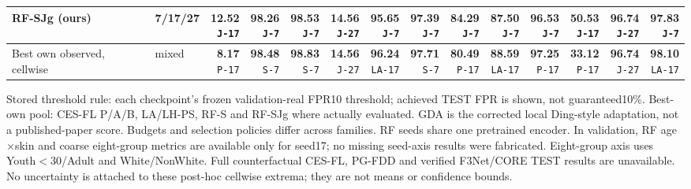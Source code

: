 \documentclass[10pt]{article}
\newcommand{\note}[1]{{\fontsize{8}{10}\selectfont #1\par}}
\begin{document}
{\begin{tabular*}{\linewidth}{@{\extracolsep{\fill}}llrrrrrrrrrrrr}
RF-SJg (ours) & 7/17/27 & \shortstack{\textbf{12.52}\\{\tiny\texttt{J-17}}} & \shortstack{\textbf{98.26}\\{\tiny\texttt{J-7}}} & \shortstack{\textbf{98.53}\\{\tiny\texttt{J-7}}} & \shortstack{\textbf{14.56}\\{\tiny\texttt{J-27}}} & \shortstack{\textbf{95.65}\\{\tiny\texttt{J-7}}} & \shortstack{\textbf{97.39}\\{\tiny\texttt{J-7}}} & \shortstack{\textbf{84.29}\\{\tiny\texttt{J-7}}} & \shortstack{\textbf{87.50}\\{\tiny\texttt{J-7}}} & \shortstack{\textbf{96.53}\\{\tiny\texttt{J-7}}} & \shortstack{\textbf{50.53}\\{\tiny\texttt{J-17}}} & \shortstack{\textbf{96.74}\\{\tiny\texttt{J-27}}} & \shortstack{\textbf{97.83}\\{\tiny\texttt{J-7}}}\\
\midrule\rowcolor{blue!8} Best own observed, cellwise & mixed & \shortstack{\textbf{8.17}\\{\tiny\texttt{P-17}}} & \shortstack{\textbf{98.48}\\{\tiny\texttt{S-7}}} & \shortstack{\textbf{98.83}\\{\tiny\texttt{S-7}}} & \shortstack{\textbf{14.56}\\{\tiny\texttt{J-27}}} & \shortstack{\textbf{96.24}\\{\tiny\texttt{LA-17}}} & \shortstack{\textbf{97.71}\\{\tiny\texttt{S-7}}} & \shortstack{\textbf{80.49}\\{\tiny\texttt{P-17}}} & \shortstack{\textbf{88.59}\\{\tiny\texttt{LA-17}}} & \shortstack{\textbf{97.25}\\{\tiny\texttt{P-17}}} & \shortstack{\textbf{33.12}\\{\tiny\texttt{P-17}}} & \shortstack{\textbf{96.74}\\{\tiny\texttt{J-27}}} & \shortstack{\textbf{98.10}\\{\tiny\texttt{LA-17}}}\\
\bottomrule\end{tabular*}}\par
\vspace{2mm}
\note{Stored threshold rule: each checkpoint's frozen validation-real FPR10 threshold; achieved TEST FPR is shown, not guaranteed10\%. Best-own pool: CES-FL P/A/B, LA/LH-PS, RF-S and RF-SJg where actually evaluated. GDA is the corrected local Ding-style adaptation, not a published-paper score. Budgets and selection policies differ across families. RF seeds share one pretrained encoder. In validation, RF age$\times$skin and coarse eight-group metrics are available only for seed17; no missing seed-axis results were fabricated. Eight-group axis uses Youth$<$30/Adult and White/NonWhite. Full counterfactual CES-FL, PG-FDD and verified F3Net/CORE TEST results are unavailable. No uncertainty is attached to these post-hoc cellwise extrema; they are not means or confidence bounds.}
\end{document}

